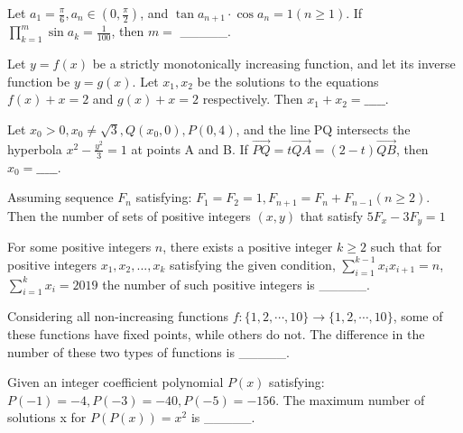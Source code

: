 \begin{problem}\label{AI-Algebra7}
Let $a_1=\frac{\pi}{6}, a_n \in (0,\frac{\pi}{2})$, and $\tan a_{n+1}\cdot \cos a_n=1 (n\geq 1)$. If $\prod\limits_{k=1}^m \sin a_k=\frac{1}{100}$, then $m=$ \_\_\_\_\_.
\end{problem}


\begin{problem}\label{AI-Algebra8}
Let $y=f(x)$ be a strictly monotonically increasing function, and let its inverse function be $y=g(x)$. Let 
 $x_1, x_2$ be the solutions to the equations $f(x)+x=2$ and $g(x)+x=2$ respectively. Then $x_1+x_2=\_\_\_\_\_$.
\end{problem}


\begin{problem}\label{AI-Algebra9}
Let $x_0>0, x_0 \neq \sqrt{3}, Q(x_0,0), P(0,4)$, and the line PQ intersects the hyperbola $x^2-\frac{y^2}{3}=1$ at points A and B. If
$\overrightarrow{PQ}=t\overrightarrow{QA}=(2-t)\overrightarrow{QB}$, then $x_0=\_\_\_\_\_$.
\end{problem}


\begin{problem}\label{AI-Algebra10}
Assuming sequence ${F_n}$ satisfying: $F_1=F_2=1, F_{n+1}=F_n+F_{n-1} (n\geq 2)$. Then the number of sets  of positive integers $(x,y)$ that satisfy $5F_x-3F_y=1$
\end{problem}


\begin{problem}\label{AI-Algebra11}
For some positive integers $n$, there exists a positive integer 
$k\geq 2$ such that for positive integers $x_1,x_2,...,x_k$ satisfying the given condition, $\sum\limits_{i=1}^{k-1}x_ix_{i+1}=n$, $\sum\limits_{i=1}^{k}x_i=2019$
the number of such positive integers is \_\_\_\_\_.
\end{problem}


\begin{problem}\label{AI-Algebra12}
Considering all non-increasing functions $f:\{1,2,\cdots,10\} \rightarrow \{1,2,\cdots,10\}$, some of these functions have fixed points, while others do not. The difference in the number of these two types of functions is \_\_\_\_\_.
\end{problem}


\begin{problem}\label{AI-Algebra13}
Given an integer coefficient polynomial $P(x)$ satisfying:
$P(-1)=-4, P(-3)=-40, P(-5)=-156$. The maximum number of solutions x for $P(P(x))=x^2$ is \_\_\_\_\_.
\end{problem}


